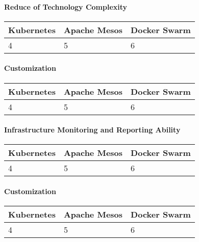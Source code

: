 \paragraph{Reduce of Technology Complexity}

\begin{center}
  \begin{tabular}{ | p{4.2cm} | p{4.2cm} | p{4.2cm} | }
    \hline
    \textbf{Kubernetes}&\textbf{Apache Mesos}&\textbf{Docker Swarm}\\\hline
    4 & 5 & 6 \\
    \hline
  \end{tabular}
\end{center}

\paragraph{Customization}

\begin{center}
  \begin{tabular}{ | p{4.2cm} | p{4.2cm} | p{4.2cm} | }
    \hline
    \textbf{Kubernetes}&\textbf{Apache Mesos}&\textbf{Docker Swarm}\\\hline
    4 & 5 & 6 \\
    \hline
  \end{tabular}
\end{center}

\paragraph{Infrastructure Monitoring and Reporting Ability}

\begin{center}
  \begin{tabular}{ | p{4.2cm} | p{4.2cm} | p{4.2cm} | }
    \hline
    \textbf{Kubernetes}&\textbf{Apache Mesos}&\textbf{Docker Swarm}\\\hline
    4 & 5 & 6 \\
    \hline
  \end{tabular}
\end{center}

\paragraph{Customization}

\begin{center}
  \begin{tabular}{ | p{4.2cm} | p{4.2cm} | p{4.2cm} | }
    \hline
    \textbf{Kubernetes}&\textbf{Apache Mesos}&\textbf{Docker Swarm}\\\hline
    4 & 5 & 6 \\
    \hline
  \end{tabular}
\end{center}

